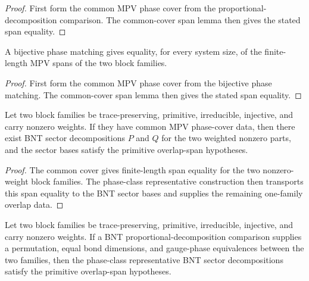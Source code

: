 \begin{proof}
	\leanok
	First form the common MPV phase cover from the proportional-decomposition
	comparison. The common-cover span lemma then gives the stated span equality.
\end{proof}

\begin{lemma}%
\label{lem:nonzero_block_span_eq_of_equiv_phase}
	\leanok
	A bijective phase matching gives equality, for every system size, of the
	finite-length MPV spans of the two block families.
\end{lemma}

\begin{proof}
	\leanok
	First form the common MPV phase cover from the bijective phase matching. The
	common-cover span lemma then gives the stated span equality.
\end{proof}

\begin{theorem}%
\label{thm:bnt_sectorDecomp_pair_overlapSpan_of_commonPhaseCover}
	\leanok
	Let two block families be trace-preserving, primitive, irreducible, injective,
	and carry nonzero weights. If they have common MPV phase-cover data, then there
	exist BNT sector decompositions $P$ and $Q$ for
	the two weighted nonzero parts, and the sector bases satisfy the primitive
	overlap-span hypotheses.
\end{theorem}

\begin{proof}
	\leanok
	The common cover gives finite-length span equality for the two nonzero-weight
	block families. The phase-class representative construction then transports
	this span equality to the BNT sector bases and supplies the remaining
	one-family overlap data.
\end{proof}

\begin{theorem}%
\label{thm:bnt_sectorDecomp_pair_overlapSpan_of_proportionalDecompositionConclusion}
	\leanok
	Let two block families be trace-preserving, primitive, irreducible, injective,
	and carry nonzero weights. If a BNT proportional-decomposition comparison
	supplies a permutation, equal bond
	dimensions, and gauge-phase equivalences between the two families, then the
	phase-class representative BNT sector decompositions satisfy the primitive
	overlap-span hypotheses.
\end{theorem}

